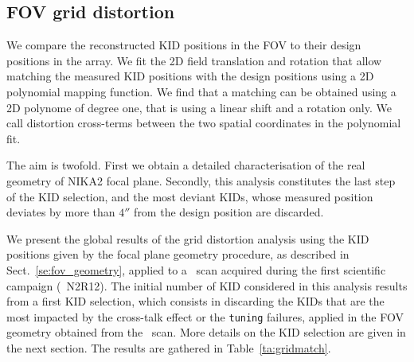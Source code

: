 \subsection{FOV grid distortion}
\label{se:grid_distortion}

We compare the reconstructed KID positions in the FOV to their design
positions in the array. We fit the 2D field translation and rotation that allow
matching the measured KID positions with the design positions using a 2D
polynomial mapping function. {\lp We find that a matching can be
obtained using a 2D polynome of degree one, that is using a linear
shift and a rotation only.} We call distortion cross-terms
between the two spatial coordinates in the polynomial fit.

The aim is twofold. First we obtain a detailed
characterisation of the real geometry of NIKA2 focal plane. Secondly,
this analysis constitutes the last step of the KID
selection, and the most deviant KIDs, whose measured position deviates
by more than $4''$ from the design position are discarded. 

We present the global results of the grid distortion
analysis using the KID positions given
by the focal plane geometry procedure, as described in
Sect.~\ref{se:fov_geometry}, applied to a \bm\ scan acquired
during the first scientific campaign (\aka\ N2R12). 
The initial
number of KID considered in this analysis results from
a first KID selection, which consists in discarding the KIDs that are the most
impacted by the cross-talk effect or the {\tt tuning} failures,
applied in the FOV geometry obtained from the \bm\ scan. More details
on the KID selection are given in the next section. %
The results are gathered in Table~\ref{ta:gridmatch}.

